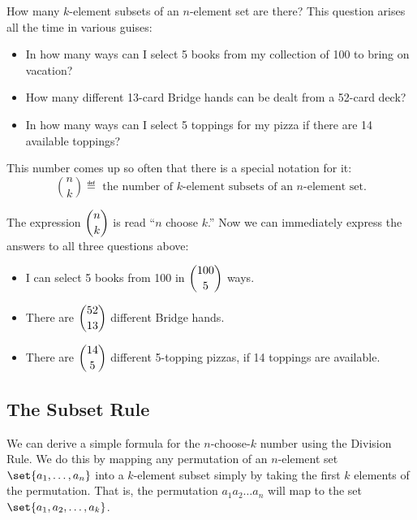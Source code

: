 \label{combinations_sec}

How many $k$-element subsets of an $n$-element set are there?  This
question arises all the time in various guises:

\begin{itemize}

\item In how many ways can I select 5 books from my collection of 100
to bring on vacation?

\item How many different 13-card Bridge hands can be dealt from a
52-card deck?

\item In how many ways can I select 5 toppings for my pizza if there
are 14 available toppings?

\end{itemize}

This number comes up so often that there is a special notation for it:
\[
\binom{n}{k} \eqdef \text{ the number of $k$-element subsets of an $n$-element set.}
\]

The expression $\dbinom{n}{k}$ is read ``$n$ choose $k$.''  Now we can
immediately express the answers to all three questions above:

\begin{itemize}

\item I can select 5 books from 100 in $\dbinom{100}{5}$ ways.

\item There are $\dbinom{52}{13}$ different Bridge hands.

\item There are $\dbinom{14}{5}$ different 5-topping pizzas, if 14
toppings are available.

\end{itemize}

\subsection{The Subset Rule}

We can derive a simple formula for the $n$-choose-$k$ number using the
Division Rule.  We do this by mapping any permutation of an $n$-element
set $\set{a_1,\dots, a_n}$ into a $k$-element subset simply by taking the
first $k$ elements of the permutation.  That is, the permutation
$a_1a_2\dots a_n$ will map to the set $\set{a_1,a_2,\dots,a_k}$.

